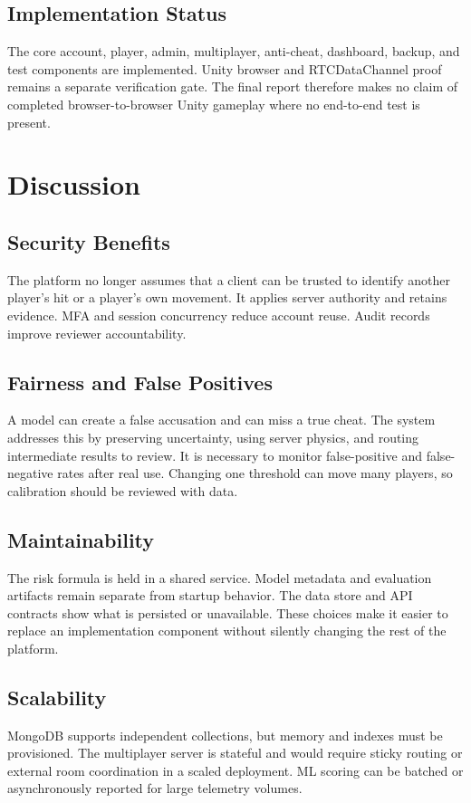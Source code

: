 \documentclass[12pt,a4paper,oneside]{report}
\begin{document}
\section{Implementation Status}
The core account, player, admin, multiplayer, anti-cheat, dashboard, backup, and test components are implemented. Unity browser and RTCDataChannel proof remains a separate verification gate. The final report therefore makes no claim of completed browser-to-browser Unity gameplay where no end-to-end test is present.

\chapter{Discussion}
\section{Security Benefits}
The platform no longer assumes that a client can be trusted to identify another player's hit or a player's own movement. It applies server authority and retains evidence. MFA and session concurrency reduce account reuse. Audit records improve reviewer accountability.

\section{Fairness and False Positives}
A model can create a false accusation and can miss a true cheat. The system addresses this by preserving uncertainty, using server physics, and routing intermediate results to review. It is necessary to monitor false-positive and false-negative rates after real use. Changing one threshold can move many players, so calibration should be reviewed with data.

\section{Maintainability}
The risk formula is held in a shared service. Model metadata and evaluation artifacts remain separate from startup behavior. The data store and API contracts show what is persisted or unavailable. These choices make it easier to replace an implementation component without silently changing the rest of the platform.

\section{Scalability}
MongoDB supports independent collections, but memory and indexes must be provisioned. The multiplayer server is stateful and would require sticky routing or external room coordination in a scaled deployment. ML scoring can be batched or asynchronously reported for large telemetry volumes.
\end{document}
